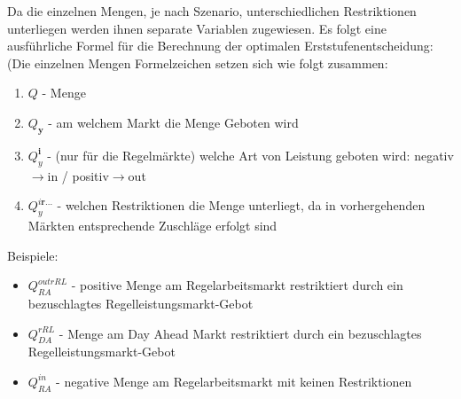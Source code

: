 Da die einzelnen Mengen, je nach Szenario, unterschiedlichen Restriktionen unterliegen werden ihnen separate Variablen zugewiesen.
Es folgt eine ausführliche Formel für die Berechnung der optimalen Erststufenentscheidung:
(Die einzelnen Mengen Formelzeichen setzen sich wie folgt zusammen:
\begin{enumerate}
	\item $Q$ - Menge
	\item $Q_{\pmb{y}}$ - am welchem Markt die Menge Geboten wird
	\item $Q^{\pmb{i}}_{y}$ - (nur für die Regelmärkte) welche Art von Leistung geboten wird: negativ$\rightarrow$in / positiv$\rightarrow$out
	\item $Q^{i\pmb{r...}}_{y}$ - welchen Restriktionen die Menge unterliegt, da in vorhergehenden Märkten entsprechende Zuschläge erfolgt sind
\end{enumerate}
Beispiele:
\begin{itemize}
	\item $Q^{outrRL}_{RA}$ - positive Menge am Regelarbeitsmarkt restriktiert durch ein bezuschlagtes Regelleistungsmarkt-Gebot
	\item $Q^{rRL}_{DA}$ - Menge am Day Ahead Markt restriktiert durch ein bezuschlagtes Regelleistungsmarkt-Gebot
	\item $Q^{in}_{RA}$ - negative Menge am Regelarbeitsmarkt mit keinen Restriktionen
\end{itemize}


